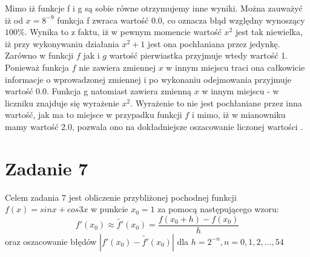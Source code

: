 \documentclass[12pt]{article}
\begin{document}
Mimo iż funkcje f i g są sobie równe otrzymujemy inne wyniki. Można zauważyć iż od $x=8^{-9}$ funkcja f zwraca wartość $0.0$, co oznacza błąd względny wynoszący $100\%$. Wynika to z faktu, iż w pewnym momencie wartość $x^2$ jest tak niewielka, iż przy wykonywaniu działania $x^2 + 1$ jest ona pochłaniana przez jedynkę. Zarówno w funkcji $f$ jak i $g$ wartość pierwiastka przyjmuje wtedy wartość 1. Ponieważ funkcja $f$ nie zawiera zmiennej $x$ w innym miejscu traci ona całkowicie informacje o wprowadzonej zmiennej i po wykonaniu odejmowania przyjmuje wartość $0.0$. Funkcja g natomiast zawiera zmienną $x$ w innym miejscu - w liczniku znajduje się wyrażenie $x^2$. Wyrażenie to nie jest pochłaniane przez inna wartość, jak ma to miejsce w przypadku funkcji $f$ i mimo, iż w mianowniku mamy wartość 2.0, pozwala ono na dokładniejsze oszacowanie liczonej wartości . 

\section{Zadanie 7}
Celem zadania 7 jest obliczenie przybliżonej pochodnej funkcji $f(x) = sinx + cos3x$ w punkcie $x_0 = 1$ za pomocą następującego wzoru: 
\begin{equation*}
	f'(x_0) \approx \widetilde{f'}(x_0) = \frac{f(x_0 + h) - f(x_0)}{h}
\end{equation*}
oraz oszacowanie błędów $|f'(x_0) - \widetilde{f'}(x_0)|$ dla $h = 2^{-n}, n = 0, 1, 2, ..., 54$
\end{document}
